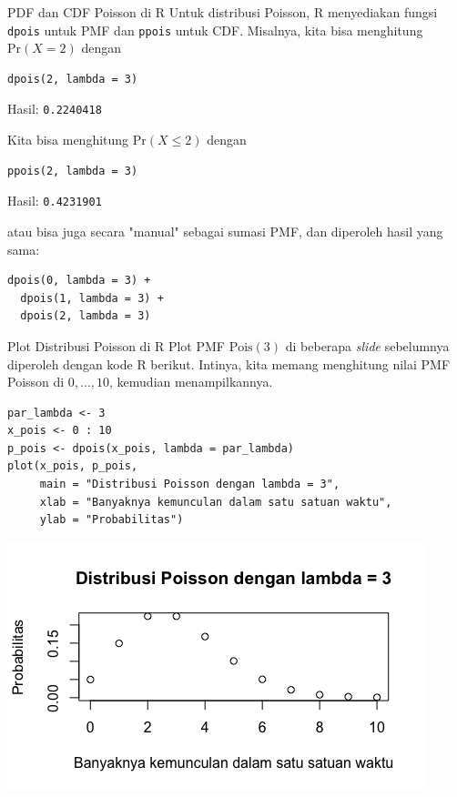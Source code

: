 \documentclass{beamer}
\begin{document}
\begin{frame}[fragile]{PDF dan CDF Poisson di R}
    Untuk distribusi Poisson, R menyediakan fungsi \verb|dpois| untuk PMF dan \verb|ppois| untuk CDF. Misalnya, kita bisa menghitung \( \text{Pr}(X=2) \) dengan
\begin{verbatim}
dpois(2, lambda = 3)
\end{verbatim}
    Hasil: \verb|0.2240418|

    Kita bisa menghitung \( \text{Pr}(X \le 2) \) dengan
\begin{verbatim}
ppois(2, lambda = 3)
\end{verbatim}
    Hasil: \verb|0.4231901|

    atau bisa juga secara "manual" sebagai sumasi PMF, dan diperoleh hasil yang sama:
\begin{verbatim}
dpois(0, lambda = 3) +
  dpois(1, lambda = 3) +
  dpois(2, lambda = 3)
\end{verbatim}
\end{frame}

\begin{frame}[fragile]{Plot Distribusi Poisson di R}
    Plot PMF \(\text{Pois}(3)\) di beberapa \textit{slide} sebelumnya diperoleh dengan kode R berikut. Intinya, kita memang menghitung nilai PMF Poisson di \(0, \dots, 10\), kemudian menampilkannya.

\begin{verbatim}
par_lambda <- 3
x_pois <- 0 : 10
p_pois <- dpois(x_pois, lambda = par_lambda)
plot(x_pois, p_pois,
     main = "Distribusi Poisson dengan lambda = 3",
     xlab = "Banyaknya kemunculan dalam satu satuan waktu",
     ylab = "Probabilitas")
\end{verbatim}

    \includegraphics[scale=0.4]{gambar/dist_pois_lambda3.png}
\end{frame}
\end{document}
